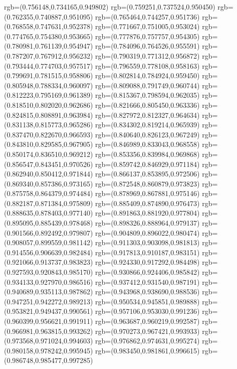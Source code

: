 {{{			rgb=(0.756148,0.734165,0.949802)
			rgb=(0.759251,0.737524,0.950450)
			rgb=(0.762355,0.740887,0.951095)
			rgb=(0.765464,0.744257,0.951736)
			rgb=(0.768558,0.747631,0.952378)
			rgb=(0.771667,0.751005,0.953024)
			rgb=(0.774765,0.754380,0.953665)
			rgb=(0.777876,0.757757,0.954305)
			rgb=(0.780981,0.761139,0.954947)
			rgb=(0.784096,0.764526,0.955591)
			rgb=(0.787207,0.767912,0.956232)
			rgb=(0.790319,0.771312,0.956872)
			rgb=(0.793444,0.774703,0.957517)
			rgb=(0.796559,0.778108,0.958163)
			rgb=(0.799691,0.781515,0.958806)
			rgb=(0.802814,0.784924,0.959450)
			rgb=(0.805948,0.788334,0.960097)
			rgb=(0.809088,0.791749,0.960744)
			rgb=(0.812223,0.795169,0.961389)
			rgb=(0.815367,0.798594,0.962035)
			rgb=(0.818510,0.802020,0.962686)
			rgb=(0.821666,0.805450,0.963336)
			rgb=(0.824815,0.808891,0.963984)
			rgb=(0.827972,0.812327,0.964634)
			rgb=(0.831138,0.815773,0.965286)
			rgb=(0.834302,0.819214,0.965939)
			rgb=(0.837470,0.822670,0.966593)
			rgb=(0.840640,0.826123,0.967249)
			rgb=(0.843810,0.829585,0.967905)
			rgb=(0.846989,0.833043,0.968558)
			rgb=(0.850174,0.836510,0.969212)
			rgb=(0.853356,0.839984,0.969868)
			rgb=(0.856547,0.843451,0.970526)
			rgb=(0.859742,0.846929,0.971184)
			rgb=(0.862940,0.850412,0.971844)
			rgb=(0.866137,0.853895,0.972506)
			rgb=(0.869340,0.857386,0.973165)
			rgb=(0.872548,0.860879,0.973823)
			rgb=(0.875758,0.864379,0.974484)
			rgb=(0.878969,0.867881,0.975146)
			rgb=(0.882187,0.871384,0.975809)
			rgb=(0.885409,0.874890,0.976473)
			rgb=(0.888635,0.878403,0.977140)
			rgb=(0.891863,0.881920,0.977804)
			rgb=(0.895095,0.885439,0.978468)
			rgb=(0.898326,0.888964,0.979137)
			rgb=(0.901566,0.892492,0.979807)
			rgb=(0.904809,0.896022,0.980474)
			rgb=(0.908057,0.899559,0.981142)
			rgb=(0.911303,0.903098,0.981813)
			rgb=(0.914556,0.906639,0.982484)
			rgb=(0.917813,0.910187,0.983151)
			rgb=(0.921066,0.913737,0.983823)
			rgb=(0.924330,0.917292,0.984498)
			rgb=(0.927593,0.920843,0.985170)
			rgb=(0.930866,0.924406,0.985842)
			rgb=(0.934133,0.927970,0.986516)
			rgb=(0.937412,0.931540,0.987191)
			rgb=(0.940689,0.935113,0.987862)
			rgb=(0.943968,0.938690,0.988536)
			rgb=(0.947251,0.942272,0.989213)
			rgb=(0.950534,0.945851,0.989888)
			rgb=(0.953821,0.949437,0.990561)
			rgb=(0.957106,0.953030,0.991236)
			rgb=(0.960399,0.956621,0.991911)
			rgb=(0.963687,0.960219,0.992587)
			rgb=(0.966981,0.963815,0.993262)
			rgb=(0.970273,0.967421,0.993933)
			rgb=(0.973568,0.971024,0.994603)
			rgb=(0.976862,0.974631,0.995274)
			rgb=(0.980158,0.978242,0.995945)
			rgb=(0.983450,0.981861,0.996615)
			rgb=(0.986748,0.985477,0.997285)
}}}
